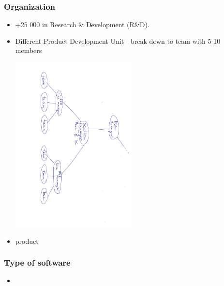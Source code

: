 \documentclass{beamer}
\begin{document}
\begin{frame}
  \frametitle{Organization}
  \begin{itemize}
  \item +25 000 in Research \& Development (R\&D).
  \item Different Product Development Unit -  break down to team with 5-10 members
    \begin{center}
    \includegraphics[width=0.5\textwidth, angle=90,origin=c]{figs/structure.pdf}
  \end{center}
  \item product
  \end{itemize}

\end{frame}

\begin{frame}
  \frametitle{Type of software}
  \begin{itemize}
  \item
  \end{itemize}
\end{frame}
\end{document}
